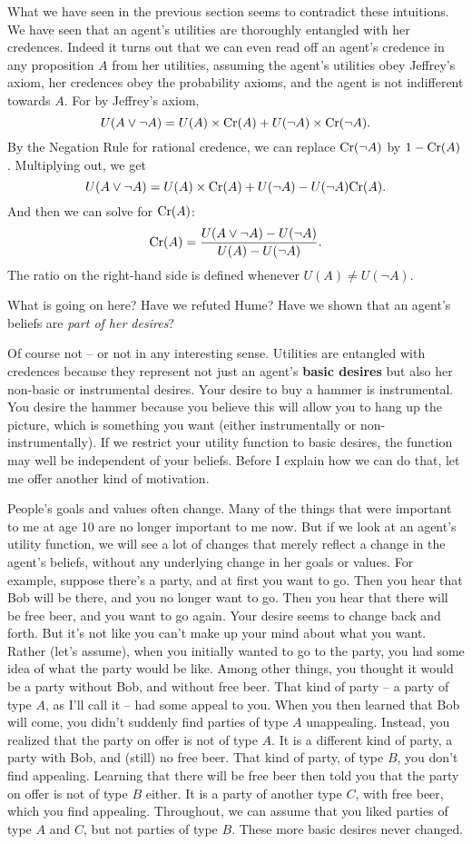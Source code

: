 What we have seen in the previous section seems to contradict these
intuitions. We have seen that an agent's utilities are thoroughly
entangled with her credences. Indeed it turns out that we can even
read off an agent's credence in any proposition $A$ from her
utilities, assuming the agent's utilities obey Jeffrey's axiom, her
credences obey the probability axioms, and the agent is not
indifferent towards $A$. For by Jeffrey's axiom,
\[
  U(A \lor \neg A) = U(A)\times \text{Cr}(A) + U(\neg A)\times \text{Cr}(\neg A).
\]
By the Negation Rule for rational credence, we can replace
$\text{Cr}(\neg A)$ by $1 - \text{Cr}(A)$. Multiplying out, we get
\[
  U(A \lor \neg A) = U(A)\times \text{Cr}(A) + U(\neg A) - U(\neg A)\text{Cr}(A).
\]
And then we can solve for $\text{Cr}(A)$:
\[
  \text{Cr}(A) = \frac{U(A \lor \neg A) - U(\neg A)}{U(A) - U(\neg A)}.
\]
The ratio on the right-hand side is defined whenever $U(A) \not= U(\neg A)$.

What is going on here? Have we refuted Hume? Have we shown that an
agent's beliefs are \emph{part of her desires}? 

Of course not -- or not in any interesting sense. Utilities are
entangled with credences because they represent not just an agent's
\textbf{basic desires} but also her non-basic or instrumental
desires. Your desire to buy a hammer is instrumental. You desire the
hammer because you believe this will allow you to hang up the picture,
which is something you want (either instrumentally or
non-instrumentally). If we restrict your utility function to basic
desires, the function may well be independent of your beliefs.  Before
I explain how we can do that, let me offer another kind of motivation.

People's goals and values often change. Many of the things that were
important to me at age 10 are no longer important to me now. But if we
look at an agent's utility function, we will see a lot of changes that
merely reflect a change in the agent's beliefs, without any underlying
change in her goals or values. For example, suppose there's a party,
and at first you want to go. Then you hear that Bob will be there, and
you no longer want to go. Then you hear that there will be free beer,
and you want to go again. Your desire seems to change back and
forth. But it's not like you can't make up your mind about what you
want. Rather (let's assume), when you initially wanted to go to the
party, you had some idea of what the party would be like. Among other
things, you thought it would be a party without Bob, and without free
beer. That kind of party -- a party of type $A$, as I'll call it --
had some appeal to you. When you then learned that Bob will come, you
didn't suddenly find parties of type $A$ unappealing. Instead, you
realized that the party on offer is not of type $A$. It is a different
kind of party, a party with Bob, and (still) no free beer. That kind
of party, of type $B$, you don't find appealing. Learning that there
will be free beer then told you that the party on offer is not of type
$B$ either. It is a party of another type $C$, with free beer, which
you find appealing. Throughout, we can assume that you liked parties
of type $A$ and $C$, but not parties of type $B$. These more basic
desires never changed.

